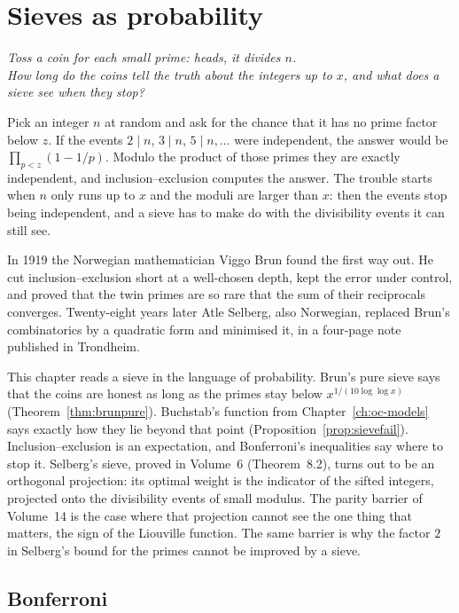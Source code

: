 \chapter{Sieves as probability}\label{ch:oc-sieves}

\begin{center}\itshape
Toss a coin for each small prime: heads, it divides $n$.\\
How long do the coins tell the truth about the integers up to $x$, and what does a sieve see when they stop?
\end{center}

Pick an integer $n$ at random and ask for the chance that it has no prime factor below $z$. If the events $2\mid n$, $3\mid n$, $5\mid n,\dots$ were independent, the answer would be $\prod_{p<z}(1-1/p)$. Modulo the product of those primes they are exactly independent, and inclusion--exclusion computes the answer. The trouble starts when $n$ only runs up to $x$ and the moduli are larger than $x$: then the events stop being independent, and a sieve has to make do with the divisibility events it can still see.

In 1919 the Norwegian mathematician Viggo Brun found the first way out. He cut inclusion--exclusion short at a well-chosen depth, kept the error under control, and proved that the twin primes are so rare that the sum of their reciprocals converges. Twenty-eight years later Atle Selberg, also Norwegian, replaced Brun's combinatorics by a quadratic form and minimised it, in a four-page note published in Trondheim.

This chapter reads a sieve in the language of probability. Brun's pure sieve says that the coins are honest as long as the primes stay below $x^{1/(10\log\log x)}$ (Theorem~\ref{thm:brunpure}). Buchstab's function from Chapter~\ref{ch:oc-models} says exactly how they lie beyond that point (Proposition~\ref{prop:sievefail}). Inclusion--exclusion is an expectation, and Bonferroni's inequalities say where to stop it. Selberg's sieve, proved in Volume~6 (Theorem~8.2), turns out to be an orthogonal projection: its optimal weight is the indicator of the sifted integers, projected onto the divisibility events of small modulus. The parity barrier of Volume~14 is the case where that projection cannot see the one thing that matters, the sign of the Liouville function. The same barrier is why the factor $2$ in Selberg's bound for the primes cannot be improved by a sieve.

\section{Bonferroni}

